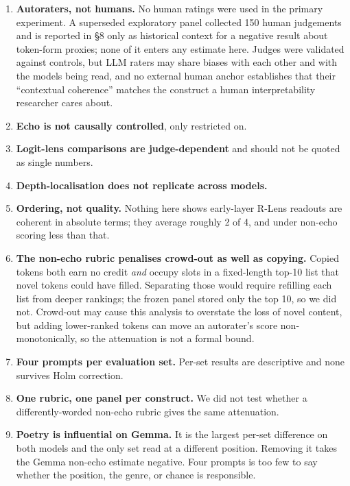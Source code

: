 \documentclass[11pt]{article}
\begin{document}
\begin{enumerate}[leftmargin=*]
      per-set breakdown, which is descriptive only.
\item \textbf{Autoraters, not humans.} No human ratings were used in the
      primary experiment. A superseded exploratory panel collected 150 human
      judgements and is reported in \S8 only as historical context for a
      negative result about token-form proxies; none of it enters any estimate
      here. Judges were validated against controls, but LLM raters may share
      biases with each other and with the models being read, and no external
      human anchor establishes that their ``contextual coherence'' matches the
      construct a human interpretability researcher cares about.
\item \textbf{Echo is not causally controlled}, only restricted on.
\item \textbf{Logit-lens comparisons are judge-dependent} and should not be
      quoted as single numbers.
\item \textbf{Depth-localisation does not replicate across models.}
\item \textbf{Ordering, not quality.} Nothing here shows early-layer R-Lens
      readouts are coherent in absolute terms; they average roughly 2 of 4, and
      under non-echo scoring less than that.
\item \textbf{The non-echo rubric penalises crowd-out as well as copying.}
      \label{sec:limits}
      Copied tokens both earn no credit \emph{and} occupy slots in a
      fixed-length top-10 list that novel tokens could have filled. Separating
      those would require refilling each list from deeper rankings; the frozen
      panel stored only the top 10, so we did not. Crowd-out may cause this
      analysis to overstate the loss of novel content, but adding lower-ranked
      tokens can move an autorater's score non-monotonically, so the attenuation
      is not a formal bound.
\item \textbf{Four prompts per evaluation set.} Per-set results are descriptive
      and none survives Holm correction.
\item \textbf{One rubric, one panel per construct.} We did not test whether a
      differently-worded non-echo rubric gives the same attenuation.
\item \textbf{Poetry is influential on Gemma.} It is the largest per-set
      difference on both models and the only set read at a different position.
      Removing it takes the Gemma non-echo estimate negative. Four prompts is
      too few to say whether the position, the genre, or chance is responsible.
\end{enumerate}
\end{document}
